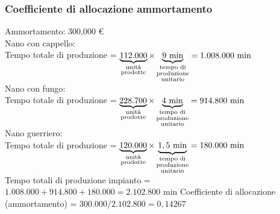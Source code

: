 \documentclass{article}
\begin{document}
\subsubsection*{Coefficiente di allocazione ammortamento}
Ammortamento: 300,000 \euro 
\vspace*{0.2cm}\\
Nano con cappello:\\
Tempo totale di produzione = $\underbrace{112.000}_{\substack{\text{unità} \\ \text{prodotte}}} \times \underbrace{9 \text{ min}}_{\substack{\text{tempo di} \\ \text{produzione} \\ \text{unitario}}} = 1.008.000 \text{ min} $
\vspace*{0.1cm}\\
Nano con fungo:\\
Tempo totale di produzione = $\underbrace{228.700}_{\substack{\text{unità} \\ \text{prodotte}}} \times \underbrace{4 \text{ min}}_{\substack{\text{tempo di} \\ \text{produzione} \\ \text{unitario}}} = 914.800 \text{ min} $
\vspace*{0.1cm}\\
Nano guerriero:\\
Tempo totale di produzione = $\underbrace{120.000}_{\substack{\text{unità} \\ \text{prodotte}}} \times \underbrace{1,5 \text{ min}}_{\substack{\text{tempo di} \\ \text{produzione} \\ \text{unitario}}} = 180.000 \text{ min} $
\vspace*{0.1cm}\\
Tempo totali di produzione impianto = $1.008.000 + 914.800 + 180.000 = 2.102.800$ min
Coefficiente di allocazione (ammortamento) = $300.000/2.102.800 = 0,14267 $
\end{document}

